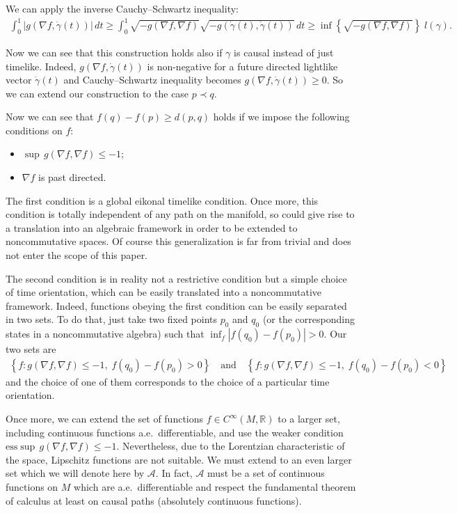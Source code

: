 \documentclass[11pt]{article}
\newcommand{\abs}[1]{\left\vert {#1} \right\vert}
\newcommand{\set}[1]{\left\{ {#1} \right\}}
\newcommand{\setR}{{\mathbb R}}
\begin{document}
We can apply the inverse Cauchy--Schwartz inequality:
\begin{gather*}
\int_0^1  \abs{g( \nabla f,\dot\gamma(t))} \, dt  \geq \int_0^1  \sqrt{-g(\nabla f,\nabla f)} \sqrt{-g(\dot\gamma(t),\dot\gamma(t))} \, dt  \geq  \inf\set{{\sqrt{-g(\nabla f,\nabla f)}}}\; l(\gamma).
\end{gather*}

Now we can see that this construction holds also if $\gamma$ is causal instead of just timelike. Indeed, $g( \nabla f,\dot\gamma(t))$ is non-negative for a future directed lightlike vector $\dot\gamma(t)$ and Cauchy--Schwartz inequality becomes $g( \nabla f,\dot\gamma(t)) \geq 0$. So we can extend our construction to the case $p \prec q$.

Now we can see that $f(q) - f(p) \geq d(p,q)$ holds if we impose the following conditions on $f$:
\begin{itemize}\itemsep=0pt
\item  $\sup\, g( \nabla f, \nabla f ) \leq -1$;
\item $\nabla f$ is past directed.
\end{itemize}

The f\/irst condition is a global eikonal timelike condition. Once more, this condition is totally independent of any path on the manifold, so could give rise to a translation into an algebraic framework in order to be extended to noncommutative spaces. Of course this generalization is far from trivial and does not enter the scope of this paper.

The second condition is in reality not a restrictive condition but a simple choice of time orientation, which can be easily translated into a noncommutative framework. Indeed, functions obeying the f\/irst condition can be easily separated in two sets. To do that, just take two f\/ixed points $p_0$ and $q_0$ (or the corresponding states in a noncommutative algebra) such that $\inf_f \abs{ f(q_0) -f(p_0) } > 0$. Our two sets are
\begin{gather*}
\set{ f : g( \nabla f, \nabla f ) \leq -1,\; f(q_0) - f(p_0) > 0}\!\!\quad\text{and}\quad\!\!  \set{ f : g( \nabla f, \nabla f ) \leq -1,\; f(q_0) - f(p_0) < 0}\!
\end{gather*}
 and the choice of one of them corresponds to the choice of a particular time orientation.

Once more, we can extend the set of functions $f \in C^\infty(M,\setR)$ to a larger set, including continuous functions a.e.\ dif\/ferentiable, and use the weaker condition $\text{ess}\sup\, g( \nabla f, \nabla f ) \leq -1$. Nevertheless, due to the Lorentzian characteristic of the space, Lipschitz functions are not suitable. We must extend to an even larger set which we will denote here by $\mathcal A$. In fact, $\mathcal A$ must be a set of continuous functions on $M$ which are a.e.\ dif\/ferentiable and respect the fundamental theorem of calculus at least on causal paths (absolutely continuous functions).
\end{document}
